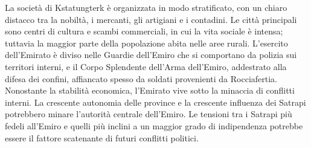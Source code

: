 \documentclass[10pt, a4paper]{report}
\begin{document}
\begin{multicols}{2}
La società di Kstatungterk è organizzata in modo stratificato, con un chiaro distacco tra la nobiltà, i mercanti, gli artigiani e i contadini. Le città principali sono centri di cultura e scambi commerciali, in cui la vita sociale è intensa; tuttavia la maggior parte della popolazione abita nelle aree rurali.
L'esercito dell'Emirato è diviso nelle Guardie dell'Emiro che si comportano da polizia sui territori interni, e il Corpo Splendente dell'Arma dell'Emiro, addestrato alla difesa dei confini, affiancato spesso da soldati provenienti da Rocciafertia.
Nonostante la stabilità economica, l’Emirato vive sotto la minaccia di conflitti interni. La crescente autonomia delle province e la crescente influenza dei Satrapi potrebbero minare l’autorità centrale dell’Emiro. Le tensioni tra i Satrapi più fedeli all’Emiro e quelli più inclini a un maggior grado di indipendenza potrebbe essere il fattore scatenante di futuri conflitti politici.


\end{multicols}
\end{document}
